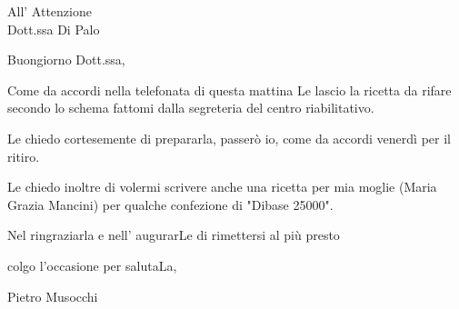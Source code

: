 \documentclass[12pt,a4paper]{letter}
\begin{document}
	\date{Sesto San Giovanni 2 Dicembre 2021}
	
	\begin{letter}{All' Attenzione \\ Dott.ssa Di Palo\\ }
		\opening {Buongiorno Dott.ssa,}
		Come da accordi nella telefonata di questa mattina Le lascio la ricetta da rifare secondo lo schema fattomi dalla segreteria del centro riabilitativo.
		
		Le chiedo cortesemente di prepararla, passerò io, come da accordi venerdì per il ritiro.
		
		Le chiedo inoltre di volermi scrivere anche una ricetta per mia moglie (Maria Grazia Mancini) per qualche confezione di "Dibase 25000".
		
		Nel ringraziarla e nell' augurarLe di rimettersi al più presto 
		\closing{colgo l'occasione per salutaLa,}
		Pietro Musocchi\\
		\\
		
		
		
	\end{letter}
\end{document}
